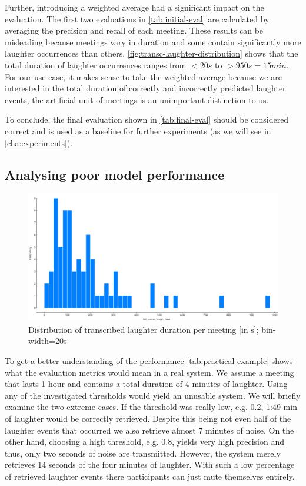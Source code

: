 \documentclass[bsc,frontabs,parskip,deptreport]{infthesis}
\begin{document}
Further, introducing a weighted average had a significant impact on the evaluation. The first two evaluations in \autoref{tab:initial-eval} are calculated by averaging the precision and recall of each meeting.
These results can be misleading because meetings vary in duration and some contain significantly more laughter occurrences than others.
\autoref{fig:transc-laughter-distribution} shows that the total duration of laughter occurrences ranges from $<20s$ to $>950s=15min$.
For our use case, it makes sense to take the weighted average because we are interested in the total duration of correctly and incorrectly predicted laughter events, the artificial unit of meetings is an unimportant distinction to us.

To conclude, the final evaluation shown in \autoref{tab:final-eval} should be considered correct and is used as a baseline for further experiments (as we will see in \autoref{cha:experiments}).



\subsection{Analysing poor model performance}

\begin{figure}
    \centering
    \includegraphics[width=13cm]{imgs/distributions/transcribed_laughter_time_distribution.png}
    \caption{Distribution of transcribed laughter duration per meeting [in s]; bin-width=20s}
    \label{fig:transc-laughter-distribution}
\end{figure}



To get a better understanding of the performance \autoref{tab:practical-example} shows what the evaluation metrics would mean in a real system. We assume a meeting that lasts 1 hour and contains a total duration of 4 minutes of laughter. 
Using any of the investigated thresholds would yield an unusable system.
We will briefly examine the two extreme cases. If the threshold was really low, e.g. 0.2, 1:49 min of laughter would be correctly retrieved. Despite this being not even half of the laughter events that occurred we also retrieve almost 7 minutes of noise.  
On the other hand, choosing a high threshold, e.g. 0.8, yields very high precision and thus, only two seconds of noise are transmitted. However, the system merely retrieves 14 seconds of the four minutes of laughter. With such a low percentage of retrieved laughter events there participants can just mute themselves entirely. 
\end{document}
